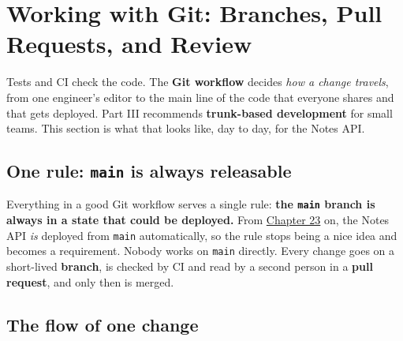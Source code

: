 \setcounter{section}{8}
\section{Working with Git: Branches, Pull Requests, and Review}\label{17-build-process:179-working-with-git-branches-pull-requests-and-review}

Tests and CI check the code. The \textbf{Git workflow} decides \emph{how a change travels}, from one engineer's editor to the main line of the code that everyone shares and that gets deployed. Part III recommends \textbf{trunk-based development} for small teams. This section is what that looks like, day to day, for the Notes API.

\subsection*{\texorpdfstring{One rule: \texttt{main} is always releasable}{One rule: main is always releasable}}\label{17-build-process:one-rule-main-is-always-releasable}

Everything in a good Git workflow serves a single rule: \textbf{the \texttt{main} branch is always in a state that could be deployed.} From \hyperref[ch:23-code-transfer]{Chapter 23} on, the Notes API \emph{is} deployed from \texttt{main} automatically, so the rule stops being a nice idea and becomes a requirement. Nobody works on \texttt{main} directly. Every change goes on a short-lived \textbf{branch}, is checked by CI and read by a second person in a \textbf{pull request}, and only then is merged.

\subsection*{The flow of one change}\label{17-build-process:the-flow-of-one-change}

